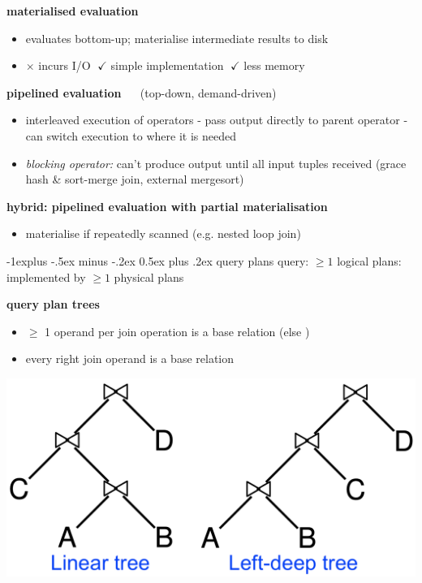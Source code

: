 \documentclass[10pt, landscape]{article}
\makeatletter
\renewcommand{\subsection}{\@startsection{subsection}{2}{0mm}%
  {-1explus -.5ex minus -.2ex}%
  {0.5ex plus .2ex}%
{\normalfont\normalsize\bfseries}}
\makeatother
\begin{document}
\begin{multicols*}{4}
  \textbf{materialised evaluation}

  \begin{itemize}
    \item evaluates bottom-up; materialise intermediate results to disk 
    \item $\times$ incurs I/O  $\;\checkmark$ simple implementation $\;\checkmark$ less memory
  \end{itemize}

  \textbf{pipelined evaluation} $\quad$ (top-down, demand-driven)

  \begin{itemize}
    \item interleaved execution of operators - pass output directly to parent operator - can switch execution to where it is needed
    \item \textit{blocking operator:} can't produce output until all input tuples received (grace hash \& sort-merge join, external mergesort)
  \end{itemize}

  \textbf{hybrid: pipelined evaluation with partial materialisation}
  \vspace*{-0.3cm}
  \begin{itemize}
    \item materialise if repeatedly scanned (e.g. nested loop join)
  \end{itemize}
  \vspace*{-0.6cm}
  \subsection{query plans}
  \vspace*{-0.3cm}
  query: $\geq 1$ logical plans: implemented by $\geq 1$ physical plans

  \textbf{query plan trees}

  \begin{minipage}[c]{0.6\linewidth}\color{black}
    \begin{itemize}
      \item {} $\geq$ 1 operand per join operation is a base relation
        (else )
      \item {} every right join operand is a base relation
    \end{itemize}
  \end{minipage}
  \begin{minipage}[c]{0.36\linewidth}
    \includegraphics[width=\linewidth]{cs3223-query-plan-trees.png} 
  \end{minipage}


\end{multicols*}
\end{document}
